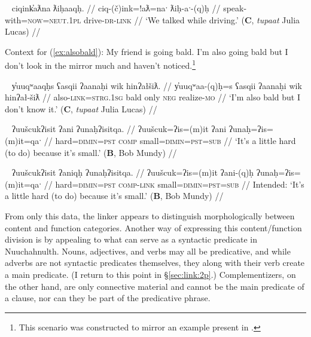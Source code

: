 \ex~ \label{ex:talkdriving}
\begingl
\glpreamble ciqink̓aƛna ƛiḥaaqḥ. //
\gla ciq-(č)ink=!aƛ=naˑ ƛiḥ-aˑ-(q)ḥ //
\glb speak-with=\textsc{now}=\textsc{neut.1pl} drive-\textsc{dr}-\textsc{link} //
\glft `We talked while driving.' (\textbf{C}, \textit{tupaat} Julia Lucas) //
\endgl
\xe

\noindent Context for (\ref{ex:alsobald}): My friend is going bald. I'm also going bald but I don't look in the mirror much and haven't noticed.\footnote{This scenario was constructed to mirror an example present in \cite{sapir1939}.}

\vspace{5pt}

\ex~ \label{ex:alsobald}
\begingl
\glpreamble y̓uuqʷaaqḥs ʕasqii ʔaanaḥi wik hinʔałšiƛ. //
\gla y̓uuqʷaa-(q)ḥ=s ʕasqii ʔaanaḥi wik hinʔał-šiƛ //
\glb also-\textsc{link}=\textsc{strg.1sg} bald only \textsc{neg} realize-\textsc{mo} //
\glft `I'm also bald but I don't know it.' (\textbf{C}, \textit{tupaat} Julia Lucas) //
\endgl
\xe

\ex~ \label{ex:hardsmall1}
\begingl
\glpreamble ʔuušcukʔisit ʔani ʔunaḥʔisitqa. //
\gla ʔuušcuk=ʔis=(m)it ʔani ʔunaḥ=ʔis=(m)it=qaˑ //
\glb hard=\textsc{dimin}=\textsc{pst} \textsc{comp} small=\textsc{dimin}=\textsc{pst}=\textsc{sub} //
\glft `It's a little hard (to do) because it's small.' (\textbf{B}, Bob Mundy) //
\endgl
\xe

\ex~ \label{ex:hardsmall2}
\begingl
\glpreamble *ʔuušcukʔisit ʔaniqḥ ʔunaḥʔisitqa. //
\gla ʔuušcuk=ʔis=(m)it ʔani-(q)ḥ ʔunaḥ=ʔis=(m)it=qaˑ //
\glb hard=\textsc{dimin}=\textsc{pst} \textsc{comp}-\textsc{link} small=\textsc{dimin}=\textsc{pst}=\textsc{sub} //
\glft Intended: `It's a little hard (to do) because it's small.' (\textbf{B}, Bob Mundy) //
\endgl
\xe

From only this data, the linker appears to distinguish morphologically between content and function categories. Another way of expressing this content/function division is by appealing to what can serve as a syntactic predicate in Nuuchahnulth. Nouns, adjectives, and verbs may all be predicative, and while adverbs are not syntactic predicates themselves, they along with their verb create a main predicate. (I return to this point in \S\ref{sec:link:2p}.) Complementizers, on the other hand, are only connective material and cannot be the main predicate of a clause, nor can they be part of the predicative phrase.


